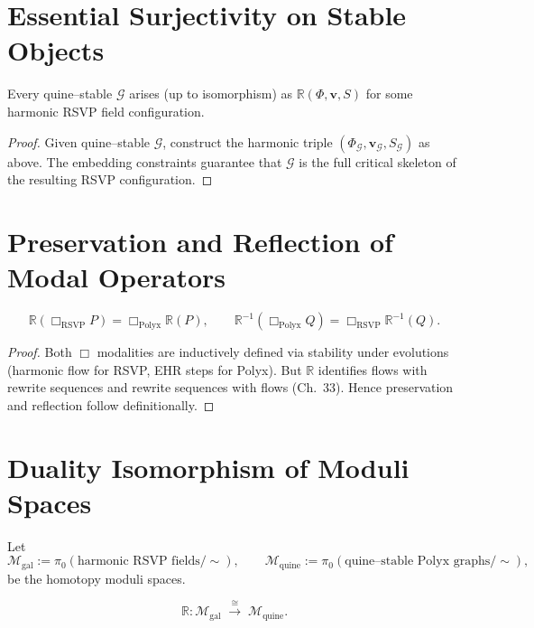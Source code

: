 \section{Essential Surjectivity on Stable Objects}

\begin{theorem}
Every quine--stable $\mathcal{G}$ arises (up to isomorphism)
as $\mathbb{R}(\Phi,\mathbf{v},S)$ for some harmonic RSVP field configuration.
\end{theorem}

\begin{proof}
Given quine--stable $\mathcal{G}$, construct the harmonic triple
$(\Phi_{\mathcal{G}},\mathbf{v}_{\mathcal{G}},S_{\mathcal{G}})$ as above.
The embedding constraints guarantee that $\mathcal{G}$
is the full critical skeleton of the resulting RSVP configuration.
\end{proof}

\section{Preservation and Reflection of Modal Operators}

\begin{theorem}
\[
\mathbb{R}(\Box_{\mathrm{RSVP}}P) = \Box_{\mathrm{Polyx}}\mathbb{R}(P),
\qquad
\mathbb{R}^{-1}(\Box_{\mathrm{Polyx}}Q) = \Box_{\mathrm{RSVP}}\mathbb{R}^{-1}(Q).
\]
\end{theorem}

\begin{proof}
Both $\Box$ modalities are inductively defined via stability under evolutions
(harmonic flow for RSVP, EHR steps for Polyx).
But $\mathbb{R}$ identifies flows with rewrite sequences
and rewrite sequences with flows (Ch.~33).
Hence preservation and reflection follow definitionally.
\end{proof}

\section{Duality Isomorphism of Moduli Spaces}

Let
\[
\mathcal{M}_{\mathrm{gal}} := \pi_0(\text{harmonic RSVP fields}/\!\!\sim),
\qquad
\mathcal{M}_{\mathrm{quine}} := \pi_0(\text{quine--stable Polyx graphs}/\!\!\sim),
\]
be the homotopy moduli spaces.

\begin{theorem}
\[
\mathbb{R} : \mathcal{M}_{\mathrm{gal}} \;\xrightarrow{\;\cong\;}\;
\mathcal{M}_{\mathrm{quine}}.
\]
\end{theorem}

